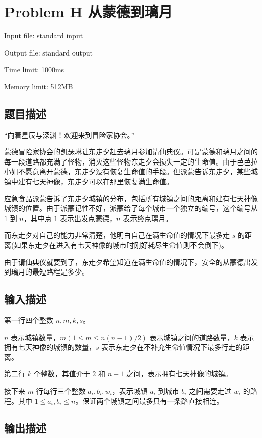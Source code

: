 \newpage
\section{Problem H 从蒙德到璃月}
{ \limitfont{}
Input file: standard input \par
Output file: standard output \par
Time limit: 1000ms \par
Memory limit: 512MB \par
}
\subsection*{题目描述}

{\kaishu “向着星辰与深渊！欢迎来到冒险家协会。”}

蒙德冒险家协会的凯瑟琳让东走夕赶去璃月参加请仙典仪。可是蒙德和璃月之间的每一段道路都充满了怪物，消灭这些怪物东走夕会损失一定的生命值。由于芭芭拉小姐不愿意离开蒙德，东走夕没有恢复生命值的手段。但派蒙告诉东走夕，某些城镇中建有七天神像，东走夕可以在那里恢复满生命值。

应急食品派蒙告诉了东走夕城镇的分布，包括所有城镇之间的距离和建有七天神像城镇的位置。由于派蒙记性不好，派蒙给了每个城市一个独立的编号，这个编号从 $1$ 到 $n$，其中点 $1$ 表示出发点蒙德，$n$ 表示终点璃月。

而东走夕对自己的能力非常清楚，他明白自己在满生命值的情况下最多走 $s$ 的距离(如果东走夕在进入有七天神像的城市时刚好耗尽生命值则不会倒下)。

由于请仙典仪就要到了，东走夕希望知道在满生命值的情况下，安全的从蒙德出发到璃月的最短路程是多少。
\subsection*{输入描述}

第一行四个整数 $n,m,k,s$。

$n$ 表示城镇数量，$m(1 \leq m \leq n(n-1)/2 )$ 表示城镇之间的道路数量，$k$ 表示拥有七天神像的城镇的数量，$s$ 表示东走夕在不补充生命值情况下最多行走的距离。

第二行 $k$ 个整数，其值介于 $2$ 和 $n-1$ 之间，表示拥有七天神像的城镇。

接下来 $m$ 行每行三个整数 $a_i,b_i,w_i$，表示城镇 $a_i$ 到城市 $b_i$ 之间需要走过 $w_i$ 的路程。其中 $1 \leq a_i,b_i \leq n$。保证两个城镇之间最多只有一条路直接相连。

\subsection*{输出描述}

